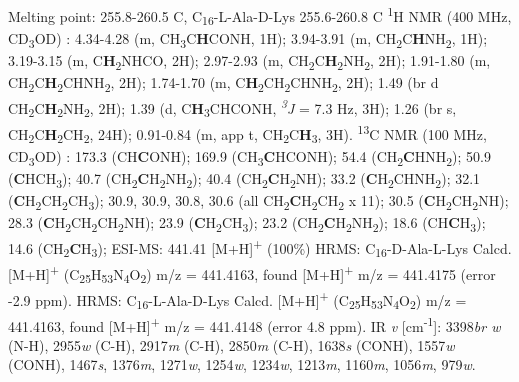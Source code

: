 Melting point: 255.8-260.5 \textdegree C, C\textsubscript{16}-L-Ala-D-Lys 255.6-260.8 \textdegree C
\newline
\textsuperscript{1}H NMR (400 MHz, CD\textsubscript{3}OD) \textdelta:  
4.34-4.28 (m, CH\textsubscript{3}C\textbf{H}CONH, 1H); 3.94-3.91 (m, CH\textsubscript{2}C\textbf{H}NH\textsubscript{2}, 1H); 3.19-3.15 (m, C\textbf{H}\textsubscript{2}NHCO, 2H); 2.97-2.93 (m, CH\textsubscript{2}C\textbf{H}\textsubscript{2}NH\textsubscript{2}, 2H); 1.91-1.80 (m, CH\textsubscript{2}C\textbf{H}\textsubscript{2}CHNH\textsubscript{2}, 2H); 1.74-1.70 (m, C\textbf{H}\textsubscript{2}CH\textsubscript{2}CHNH\textsubscript{2}, 2H); 1.49 (br d CH\textsubscript{2}C\textbf{H}\textsubscript{2}NH\textsubscript{2}, 2H); 1.39 (d, C\textbf{H}\textsubscript{3}CHCONH, \textit{\textsuperscript{3}J} = 7.3 Hz, 3H); 1.26 (br s, CH\textsubscript{2}C\textbf{H}\textsubscript{2}CH\textsubscript{2}, 24H);  0.91-0.84 (m, app t, CH\textsubscript{2}C\textbf{H}\textsubscript{3}, 3H).     
\newline
\textsuperscript{13}C NMR (100 MHz, CD\textsubscript{3}OD) \textdelta:
173.3 (CH\textbf{C}ONH); 169.9 (CH\textsubscript{3}\textbf{C}HCONH); 54.4 (CH\textsubscript{2}\textbf{C}HNH\textsubscript{2}); 50.9 (\textbf{C}HCH\textsubscript{3}); 40.7 (CH\textsubscript{2}\textbf{C}H\textsubscript{2}NH\textsubscript{2}); 40.4 (CH\textsubscript{2}\textbf{C}H\textsubscript{2}NH); 33.2 (\textbf{C}H\textsubscript{2}CHNH\textsubscript{2}); 32.1 (\textbf{C}H\textsubscript{2}CH\textsubscript{2}CH\textsubscript{3}); 30.9, 30.9, 30.8, 30.6 (all CH\textsubscript{2}\textbf{C}H\textsubscript{2}CH\textsubscript{2} x 11); 30.5 (\textbf{C}H\textsubscript{2}CH\textsubscript{2}NH); 28.3 (\textbf{C}H\textsubscript{2}CH\textsubscript{2}CH\textsubscript{2}NH); 23.9 (\textbf{C}H\textsubscript{2}CH\textsubscript{3}); 23.2 (CH\textsubscript{2}\textbf{C}H\textsubscript{2}NH\textsubscript{2}); 18.6 (CH\textbf{C}H\textsubscript{3}); 14.6 (CH\textsubscript{2}\textbf{C}H\textsubscript{3});  
\newline
ESI-MS: 441.41 [M+H]\textsuperscript{+} (100\%) 
\newline
HRMS: C\textsubscript{16}-D-Ala-L-Lys Calcd. [M+H]\textsuperscript{+} (C\textsubscript{25}H\textsubscript{53}N\textsubscript{4}O\textsubscript{2}) m/z = 441.4163, found [M+H]\textsuperscript{+} m/z = 441.4175 (error -2.9 ppm).
\newline
HRMS: C\textsubscript{16}-L-Ala-D-Lys Calcd. [M+H]\textsuperscript{+} (C\textsubscript{25}H\textsubscript{53}N\textsubscript{4}O\textsubscript{2}) m/z = 441.4163, found [M+H]\textsuperscript{+} m/z = 441.4148 (error 4.8 ppm).
\newline
IR \textit{v} [cm\textsuperscript{-1}]: 3398\textit{br w} (N-H), 2955\textit{w} (C-H), 2917\textit{m} (C-H), 2850\textit{m} (C-H), 1638\textit{s} (CONH), 1557\textit{w} (CONH), 1467\textit{s}, 1376\textit{m}, 1271\textit{w}, 1254\textit{w}, 1234\textit{w}, 1213\textit{m}, 1160\textit{m}, 1056\textit{m}, 979\textit{w}.
\newline


